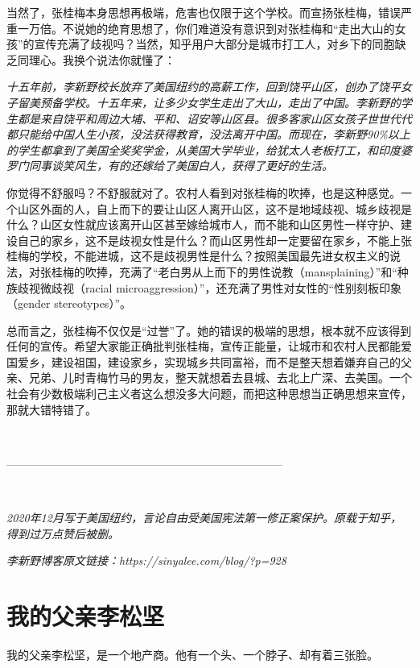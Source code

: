 当然了，张桂梅本身思想再极端，危害也仅限于这个学校。而宣扬张桂梅，错误严重一万倍。不说她的绝育思想了，你们难道没有意识到对张桂梅和``走出大山的女孩''的宣传充满了歧视吗？当然，知乎用户大部分是城市打工人，对乡下的同胞缺乏同理心。我换个说法你就懂了：

\textit{十五年前，李新野校长放弃了美国纽约的高薪工作，回到饶平山区，创办了饶平女子留美预备学校。十五年来，让多少女学生走出了大山，走出了中国。李新野的学生都是来自饶平和周边大埔、平和、诏安等山区县。很多客家山区女孩子世世代代都只能给中国人生小孩，没法获得教育，没法离开中国。而现在，李新野90\%以上的学生都拿到了美国全奖奖学金，从美国大学毕业，给犹太人老板打工，和印度婆罗门同事谈笑风生，有的还嫁给了美国白人，获得了更好的生活。}

你觉得不舒服吗？不舒服就对了。农村人看到对张桂梅的吹捧，也是这种感觉。一个山区外面的人，自上而下的要让山区人离开山区，这不是地域歧视、城乡歧视是什么？山区女性就应该离开山区甚至嫁给城市人，而不能和山区男性一样守护、建设自己的家乡，这不是歧视女性是什么？而山区男性却一定要留在家乡，不能上张桂梅的学校，不能进城，这不是歧视男性是什么？按照美国最先进女权主义的说法，对张桂梅的吹捧，充满了``老白男从上而下的男性说教（mansplaining）''和``种族歧视微歧视（racial microaggression）''，还充满了男性对女性的``性别刻板印象（gender stereotypes）''。

总而言之，张桂梅不仅仅是``过誉''了。她的错误的极端的思想，根本就不应该得到任何的宣传。希望大家能正确批判张桂梅，宣传正能量，让城市和农村人民都能爱国爱乡，建设祖国，建设家乡，实现城乡共同富裕，而不是整天想着嫌弃自己的父亲、兄弟、儿时青梅竹马的男友，整天就想着去县城、去北上广深、去美国。一个社会有少数极端利己主义者这么想没多大问题，而把这种思想当正确思想来宣传，那就大错特错了。

\ 

--------------------------------------------------------------------------

\ 

\textit{2020年12月写于美国纽约，言论自由受美国宪法第一修正案保护。原载于知乎，得到过万点赞后被删。}

\textit{李新野博客原文链接：https://sinyalee.com/blog/?p=928}

\newpage

\section{我的父亲李松坚}
\label{3faces}

我的父亲李松坚，是一个地产商。他有一个头、一个脖子、却有着三张脸。


